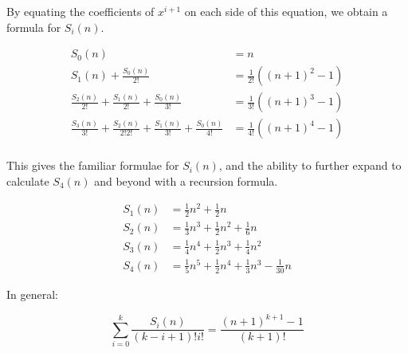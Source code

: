 \documentclass{article}
\begin{document}
By equating the coefficients of $x^{i+1}$ on each side of this equation, we obtain a formula
for $S_i(n)$.

\begin{align*}
	S_0(n) &= n \\
	S_1(n) + \frac{S_0(n)}{2!} &= \frac{1}{2!}((n+1)^2 -1) \\
	\frac{S_2(n)}{2!} + \frac{S_1(n)}{2!} + \frac{S_0(n)}{3!} 
	&= \frac{1}{3!}\left( (n+1)^3 - 1 \right) \\
	\frac{S_3(n)}{3!} + \frac{S_2(n)}{2!2!} + \frac{S_1(n)}{3!} + \frac{S_0(n)}{4!} 
	&= \frac{1}{4!}\left( (n+1)^4 - 1 \right) \\
\end{align*}

This gives the familiar formulae for $S_i(n)$, and the ability to further expand to
calculate $S_4(n)$ and beyond with a recursion formula.

\begin{align*}
	S_1(n) &= \frac{1}{2}n^2 + \frac{1}{2}n \\
	S_2(n) &= \frac{1}{3}n^3 + \frac{1}{2}n^2 + \frac{1}{6}n \\
	S_3(n) &= \frac{1}{4}n^4 + \frac{1}{2}n^3 + \frac{1}{4}n^2 \\
	S_4(n) &= \frac{1}{5}n^5 + \frac{1}{2}n^4 + \frac{1}{3}n^3 - \frac{1}{30}n 
\end{align*}

In general:

\[ \sum_{i=0}^{k} \frac{S_i(n)}{(k - i + 1)!i!} = \frac{(n+1)^{k+1} - 1}{(k+1)!} \]
\end{document}
